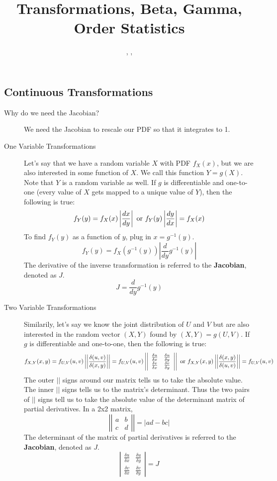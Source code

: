 \documentclass[11.5pt]{article}
\title{Transformations, Beta, Gamma, Order Statistics}
\author{\shira, \tim, \creds}
\begin{document}
\maketitle

\begin{notes}

\section*{Continuous Transformations}
\begin{description}
	\item[Why do we need the Jacobian?] We need the Jacobian to rescale our PDF so that it integrates to 1.
	\item[One Variable Transformations] Let's say that we have a random variable $X$ with PDF $f_X(x)$, but we are also interested in some function of $X$. We call this function $Y = g(X)$. Note that $Y$ is a random variable as well. If $g$ is differentiable and one-to-one (every value of $X$ gets mapped to a unique value of $Y$), then the following is true:
	\[f_Y(y) = f_X(x)\left|\frac{dx}{dy}\right| \textnormal{ or } f_Y(y) \left|\frac{dy}{dx}\right|= f_X(x)\]
	To find $f_Y(y)$ as a function of $y$, plug in $x = g^{-1}(y)$.
	\[f_Y(y) = f_X(g^{-1}(y))\left|\frac{d}{dy}g^{-1}(y)\right|\]
	The derivative of the inverse transformation is referred to the \textbf{Jacobian}, denoted as $J$.
	\[J = \frac{d}{dy}g^{-1}(y)\]
	\item[Two Variable Transformations] Similarily, let's say we know the joint distribution of $U$ and $V$ but are also interested in the random vector $(X, Y)$ found by $(X, Y) = g(U, V)$. If $g$ is differentiable and one-to-one, then the following is true:
	\[f_{X,Y}(x, y) = f_{U,V}(u,v) \left|\left| \frac{\delta(u, v)}{\delta(x, y)} \right|\right| = f_{U,V}(u,v)\left| \left| 
	\begin{array}{ccc}
		\frac{\delta u}{\delta x} & \frac{\delta u}{\delta y} \\
		\frac{\delta v}{\delta x} & \frac{\delta v}{\delta y} 
	\end{array}
	\right| \right| \textnormal{ or } f_{X,Y}(x, y) \left|\left| \frac{\delta(x, y)}{\delta(u, v)} \right|\right| = f_{U,V}(u,v) 
	\]
	The outer $||$ signs around our matrix tells us to take the absolute value. The inner $||$ signs tells us to the matrix's determinant. Thus the two pairs of $||$ signs tell us to take the absolute value of the determinant matrix of partial derivatives. In a 2x2 matrix, 
	\[ \left| \left|
	\begin{array}{ccc}
		a & b \\
		c & d
	\end{array}
	\right| \right| = |ad - bc|\]
	The determinant of the matrix of partial derivatives is referred to the \textbf{Jacobian}, denoted as $J$.
	\[\left| \begin{array}{ccc}
		\frac{\delta u}{\delta x} & \frac{\delta u}{\delta y} \\
		\frac{\delta v}{\delta x} & \frac{\delta v}{\delta y} 
	\end{array}\right| = J\]


\end{description}
\end{notes}
\end{document}
